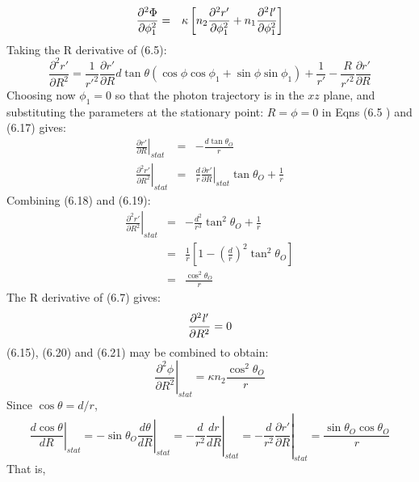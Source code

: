 {\begin{eqnarray}
 \frac{\partial^2 \Phi}{\partial\phi_1^2} & = & \kappa \left[n_2  \frac{\partial^2 r'}{\partial \phi_1^2}
  + n_1  \frac{\partial^2 {\it l}'}{\partial \phi_1^2}\right]
\end{eqnarray}
 Taking the R derivative of (6.5):
  \begin{equation}
 \frac{\partial^2 r'}{\partial R^2} = \frac{1}{r'^2}\frac{\partial r'}{\partial R} d \tan \theta
 (\cos \phi \cos \phi_1+ \sin \phi \sin \phi_1)+\frac{1}{r'}-\frac{R}{r'^2}\frac{\partial r'}{\partial R}
 \end{equation}
 Choosing now $\phi_1 = 0$ so that the photon trajectory is in the $xz$ plane, and substituting the parameters
  at the stationary point: $R = \phi =0$ in Eqns (6.5 ) and (6.17) gives:  
\begin{eqnarray}
 \left.\frac{\partial r'}{\partial R}\right|_{stat} & = &   -\frac{d \tan \theta_O}{r} \\
 \left.\frac{\partial^2 r'}{\partial R^2}\right|_{stat} & = &  \frac{d}{r}
 \left.\frac{\partial r'}{\partial R} \right|_{stat}  \tan \theta_O + \frac{1}{r} 
\end{eqnarray}
Combining (6.18) and (6.19):
\begin{eqnarray}
 \left.\frac{\partial^2 r'}{\partial R^2}\right|_{stat} & = &  -\frac{d^2}{r^3}\tan^2 \theta_O
   + \frac{1}{r} \nonumber \\
 & = &  \frac{1}{r} \left[1- \left(\frac{d}{r}\right)^2 \tan^2 \theta_O \right] \nonumber \\
 & = &  \frac{\cos^2 \theta_O}{r}
\end{eqnarray}
 The R derivative of (6.7) gives:
 \begin{equation}
  \frac{\partial^2 {\it l}'}{\partial R^2} = 0 
 \end{equation}
 (6.15), (6.20) and (6.21) may be combined to obtain:
  \begin{equation}
 \left.  \frac{\partial^2 \phi}{\partial R^2} \right|_{stat} =
  \kappa n_2 \frac{\cos^2 \theta_O}{r}
 \end{equation}
 Since $\cos \theta = d/r$,
   \begin{equation}
  \left. \left. \left. \left.\frac{d \cos \theta}{d R}\right|_{stat} = -\sin  \theta_O 
   \frac{d \theta}{d R}\right|_{stat} = - \frac{d}{r^2}
  \frac{d  r}{d  R}\right|_{stat} =  - \frac{d}{r^2}\frac{\partial r'}{\partial R}\right|_{stat} 
    = \frac{\sin  \theta_O  \cos  \theta_O }{r}
 \end{equation}
  That is,
  \begin{equation}

\end{equation}}
